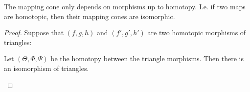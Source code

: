     \begin{lemma}
        The mapping cone only depends on morphisms up to homotopy. I.e. if two maps are homotopic, then their mapping cones are isomorphic.
    \end{lemma}

    \begin{proof}
        Suppose that $(f,g,h)$ and $(f',g',h')$ are two homotopic morphisms of triangles:
        \begin{center}
        \end{center}
        Let $(\Theta,\Phi,\Psi)$ be the homotopy between the triangle morphisms. Then there is an isomorphism of triangles.
        \begin{center}
\end{center}
\end{proof}
